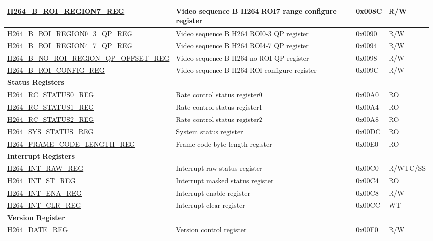 \begin{longtable}{ | p{7cm} | p{6.2cm} | p{1.2cm} | p{1cm} | }
\hyperref[regdesc:H264BROIREGION7REG]{H264\_B\_ROI\_REGION7\_REG} & Video sequence B H264 ROI7 range configure register & 0x008C & R/W \\ \hline
\hyperref[regdesc:H264BROIREGION03QPREG]{H264\_B\_ROI\_REGION0\_3\_QP\_REG} & Video sequence B H264 ROI0-3 QP register & 0x0090 & R/W \\ \hline
\hyperref[regdesc:H264BROIREGION47QPREG]{H264\_B\_ROI\_REGION4\_7\_QP\_REG} & Video sequence B H264 ROI4-7 QP register & 0x0094 & R/W \\ \hline
\hyperref[regdesc:H264BNOROIREGIONQPOFFSETREG]{H264\_B\_NO\_ROI\_REGION\_QP\_OFFSET\_REG} & Video sequence B H264 no ROI QP register & 0x0098 & R/W \\ \hline
\hyperref[regdesc:H264BROICONFIGREG]{H264\_B\_ROI\_CONFIG\_REG} & Video sequence B H264 ROI configure register & 0x009C & R/W \\ \hline

\multicolumn{4}{|l|}{\textbf{Status Registers}} \\ \hline
\hyperref[regdesc:H264RCSTATUS0REG]{H264\_RC\_STATUS0\_REG} & Rate control status register0 & 0x00A0 & RO \\ \hline
\hyperref[regdesc:H264RCSTATUS1REG]{H264\_RC\_STATUS1\_REG} & Rate control status register1 & 0x00A4 & RO \\ \hline
\hyperref[regdesc:H264RCSTATUS2REG]{H264\_RC\_STATUS2\_REG} & Rate control status register2 & 0x00A8 & RO \\ \hline
\hyperref[regdesc:H264SYSSTATUSREG]{H264\_SYS\_STATUS\_REG} & System status register & 0x00DC & RO \\ \hline
\hyperref[regdesc:H264FRAMECODELENGTHREG]{H264\_FRAME\_CODE\_LENGTH\_REG} & Frame code byte length register & 0x00E0 & RO \\ \hline
\multicolumn{4}{|l|}{\textbf{Interrupt Registers}} \\ \hline
\hyperref[regdesc:H264INTRAWREG]{H264\_INT\_RAW\_REG} & Interrupt raw status register & 0x00C0 & R/WTC/SS \\ \hline
\hyperref[regdesc:H264INTSTREG]{H264\_INT\_ST\_REG} & Interrupt masked status register & 0x00C4 & RO \\ \hline
\hyperref[regdesc:H264INTENAREG]{H264\_INT\_ENA\_REG} & Interrupt enable register & 0x00C8 & R/W \\ \hline
\hyperref[regdesc:H264INTCLRREG]{H264\_INT\_CLR\_REG} & Interrupt clear register & 0x00CC & WT \\ \hline
\multicolumn{4}{|l|}{\textbf{Version Register}} \\ \hline
\hyperref[regdesc:H264DATEREG]{H264\_DATE\_REG} & Version control register & 0x00F0 & R/W \\ \hline
\end{longtable}
